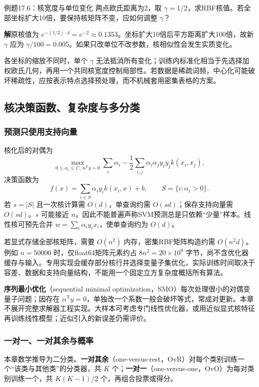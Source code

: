 \documentclass[UTF8,fontset=none,zihao=-4,a4paper]{ctexart}
\newcommand{\term}[1]{\textbf{#1}}
\newcommand{\sol}{\par\noindent\textbf{解}\quad}
\numberwithin{equation}{section}
\numberwithin{figure}{section}
\begin{document}
\begin{infobox}[unbreakable]{例题17.6：核宽度与单位变化}
两点欧氏距离为2，取 $\gamma=1/2$，求RBF核值。若全部坐标扩大10倍，要保持核矩阵不变，应如何调整 $\gamma$？
\sol 原核值为 $e^{-(1/2)\cdot4}=e^{-2}\approx0.1353$。坐标扩大10倍后平方距离扩大100倍，故新 $\gamma$ 应为 $\gamma/100=0.005$。如果只改单位不改参数，核相似性会发生实质变化。
\end{infobox}
各坐标的缩放不同时，单个 $\gamma$ 无法抵消所有变化；训练内标准化相当于先选择加权欧氏几何，再用一个共同核宽度控制局部性。若数据是稀疏词频，中心化可能破坏稀疏性，应按表示特点选择预处理，而不机械套用密集表格的方案。

\subsection{核决策函数、复杂度与多分类}
\subsubsection{预测只使用支持向量}
核化后的对偶为
\[
 \max_{0\le\alpha_i\le C,\ \alpha^{\mathsf T}y=0}
 \sum_i\alpha_i-\frac12\sum_{i,j}\alpha_i\alpha_jy_iy_jk(x_i,x_j),
\]
决策函数为
\begin{equation}\label{eq:svm-kernel-predict}
 f(x)=\sum_{i\in S}\alpha_i y_i k(x_i,x)+b,
 \qquad S=\{i:\alpha_i>0\}.
\end{equation}
若 $s=|S|$ 且一次核计算需 $O(d)$，单查询约需 $O(sd)$；保存支持向量需 $O(sd)$。$s$ 可能接近 $n$，因此不能普遍声称SVM预测总是只依赖“少量”样本。线性核可预先合并 $w=\sum_i\alpha_i y_ix_i$，使单查询约为 $O(d)$。

若显式存储全部核矩阵，需要 $O(n^2)$ 内存，密集RBF矩阵构造约需 $O(n^2d)$。例如 $n=50000$ 时，仅float64矩阵元素约占 $8n^2=20\times10^9$ 字节，尚不含优化器缓存与输入。专用实现会缓存部分核行并选择变量子集优化，实际训练时间取决于容差、数据和支持向量结构，不能用一个固定立方复杂度概括所有算法。

\term{序列最小优化}（sequential minimal optimization，SMO）每次处理很小的对偶变量子问题；因存在 $\alpha^{\mathsf T}y=0$，单独改一个系数一般会破坏等式，常成对更新。本章不展开完整求解器工程实现。大样本可考虑专门线性优化器，或用近似显式核特征再训练线性模型；近似引入的新误差仍需评价。

\subsubsection{一对一、一对其余与概率}
本章数学推导为二分类。\term{一对其余}（one-versus-rest，OvR）对每个类别训练一个“该类与其他类”的分类器，共 $K$ 个；\term{一对一}（one-versus-one，OvO）为每对类别训练一个，共 $K(K-1)/2$ 个，再组合投票或得分。
\end{document}
